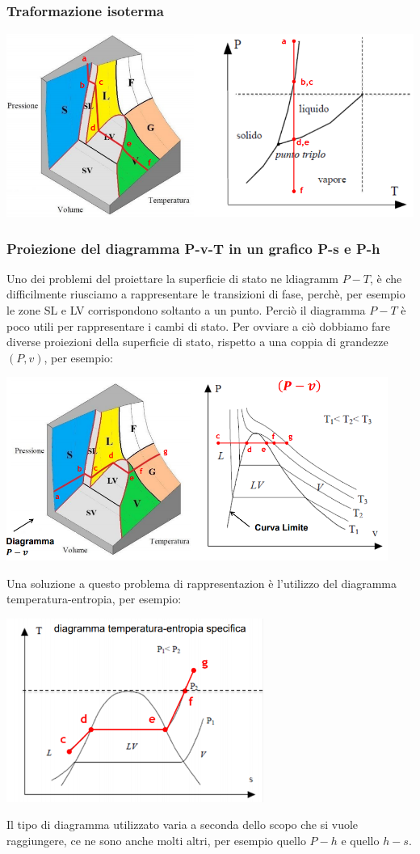 \subsubsection{Traformazione isoterma}
\begin{center}
    \includegraphics[height=6cm]{../L04/img7.PNG}
\end{center}
\subsubsection{Proiezione del diagramma P-v-T in un grafico P-s e P-h}
Uno dei problemi del proiettare la superficie di stato ne ldiagramm $P-T$, è che difficilmente riusciamo a rappresentare le transizioni di fase, perchè, per esempio le zone SL e LV corrispondono soltanto a un punto. Perciò il diagramma $P-T$ è poco utili per rappresentare i cambi di stato. Per ovviare a ciò dobbiamo fare diverse proiezioni della superficie di stato, rispetto a una coppia di grandezze $(P,v)$, per esempio:
\begin{center}
    \includegraphics[height=6cm]{../L04/img8.PNG}
\end{center}
Una soluzione a questo problema di rappresentazion è l'utilizzo del diagramma temperatura-entropia, per esempio:
\begin{center}
    \includegraphics[height=6cm]{../L04/img9.PNG}
\end{center}
Il tipo di diagramma utilizzato varia a seconda dello scopo che si vuole raggiungere, ce ne sono anche molti altri, per esempio quello $P-h$ e quello $h-s$.
